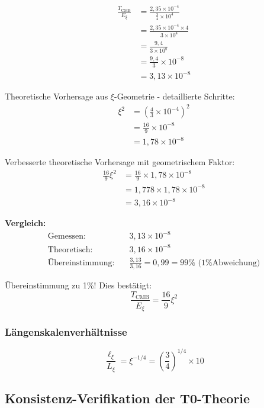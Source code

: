 \documentclass[12pt,a4paper]{article}
\begin{document}
	\begin{align}
		\frac{T_{\text{CMB}}}{E_\xi} &= \frac{2,35 \times 10^{-4}}{\frac{3}{4} \times 10^4} \\
		&= \frac{2,35 \times 10^{-4} \times 4}{3 \times 10^4} \\
		&= \frac{9,4}{3 \times 10^8} \\
		&= \frac{9,4}{3} \times 10^{-8} \\
		&= 3,13 \times 10^{-8}
	\end{align}
	
	Theoretische Vorhersage aus $\xi$-Geometrie - detaillierte Schritte:
	\begin{align}
		\xi^2 &= \left(\frac{4}{3} \times 10^{-4}\right)^2 \\
		&= \frac{16}{9} \times 10^{-8} \\
		&= 1,78 \times 10^{-8}
	\end{align}
	
	Verbesserte theoretische Vorhersage mit geometrischem Faktor:
	\begin{align}
		\frac{16}{9}\xi^2 &= \frac{16}{9} \times 1,78 \times 10^{-8} \\
		&= 1,778 \times 1,78 \times 10^{-8} \\
		&= 3,16 \times 10^{-8}
	\end{align}
	
	\textbf{Vergleich:}
	\begin{align}
		\text{Gemessen:} \quad &3,13 \times 10^{-8} \\
		\text{Theoretisch:} \quad &3,16 \times 10^{-8} \\
		\text{Übereinstimmung:} \quad &\frac{3,13}{3,16} = 0,99 = 99\% \text{ (1\% Abweichung)}
	\end{align}
	
	Übereinstimmung zu 1\%! Dies bestätigt:
	\begin{equation}
		\boxed{\frac{T_{\text{CMB}}}{E_\xi} = \frac{16}{9}\xi^2}
	\end{equation}
	
	\subsubsection{Längenskalenverhältnisse}
	
	\begin{equation}
		\frac{\ell_{\xi}}{L_\xi} = \xi^{-1/4} = \left(\frac{3}{4}\right)^{1/4} \times 10
	\end{equation}
	
	\subsection{Konsistenz-Verifikation der T0-Theorie}
	
\end{document}

